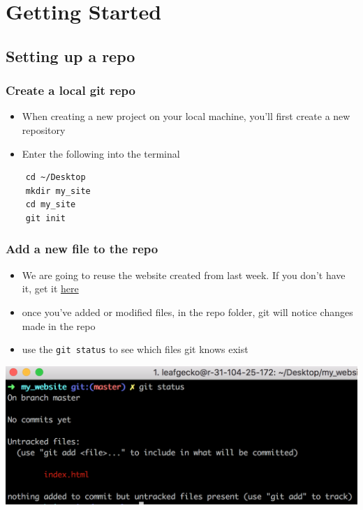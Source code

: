 \documentclass[12pt]{beamer}
\begin{document}
\section{Getting Started}
\subsection{Setting up a repo}
\begin{frame}[fragile]
\frametitle{Create a local git repo}
\begin{itemize}
	\item When creating a new project on your local machine, you'll first create a new repository
	\item Enter the following into the terminal
\end{itemize}
\begin{center}
\begin{minipage}{0.5\textwidth}
	\begin{verbatim}
	cd ~/Desktop
	mkdir my_site
	cd my_site
	git init
	\end{verbatim}
\end{minipage}
\end{center}
\end{frame}

\begin{frame}
\frametitle{Add a new file to the repo}
\begin{itemize}
	\item We are going to reuse the website created from last week. If you don't have it, get it \href{http://todo}{here}
	\item once you've added or modified files, in the repo folder, git will notice changes made in the repo
	\item use the \texttt{git status} to see which files git knows exist
\end{itemize}
\begin{center}
	\includegraphics[width=0.5\linewidth]{git_status}
\end{center}
\end{frame}
\end{document}
